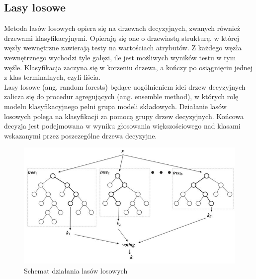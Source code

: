 \documentclass{article}
\begin{document}
\subsection{Lasy losowe}
Metoda lasów losowych opiera się na drzewach decyzyjnych, zwanych również drzewami klasyfikacyjnymi. Opierają się one o drzewiastą strukturę, w której węzły wewnętrzne zawierają testy na wartościach atrybutów. Z każdego węzła wewnętrznego wychodzi tyle gałęzi, ile jest możliwych wyników testu w tym węźle.  Klasyfikacja zaczyna się w korzeniu drzewa, a kończy po osiągnięciu jednej z klas terminalnych, czyli liścia.\\ 
Lasy losowe (ang. random forests) będące  uogólnieniem idei drzew decyzyjnych zalicza się do procedur agregujących (ang. ensemble method), w których rolę modelu klasyfikacyjnego pełni grupa modeli składowych. Działanie lasów losowych polega na klasyfikacji za pomocą grupy drzew decyzyjnych. Końcowa decyzja jest podejmowana w wyniku  głosowania większościowego  nad klasami wskazanymi przez poszczególne drzewa decyzyjne.
\begin{figure}[htp]
	\centering
	\includegraphics[width=1\textwidth]{Figures/rf.jpg}
	\caption{Schemat działania lasów losowych }
\end{figure}
\end{document}
